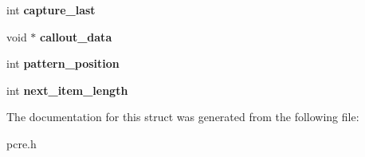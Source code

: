 \begin{DoxyCompactItemize}
\item 
\hypertarget{structpcre__callout__block_a989a280260effb9bf1521046a2507643}{
int {\bfseries capture\_\-last}}
\label{structpcre__callout__block_a989a280260effb9bf1521046a2507643}

\item 
\hypertarget{structpcre__callout__block_a45304eee0f48c835714a82fa762bab1c}{
void $\ast$ {\bfseries callout\_\-data}}
\label{structpcre__callout__block_a45304eee0f48c835714a82fa762bab1c}

\item 
\hypertarget{structpcre__callout__block_ac5caf602fa5ab812f8721451320b7adf}{
int {\bfseries pattern\_\-position}}
\label{structpcre__callout__block_ac5caf602fa5ab812f8721451320b7adf}

\item 
\hypertarget{structpcre__callout__block_a9360879d608b622daef0c7d1cf2606be}{
int {\bfseries next\_\-item\_\-length}}
\label{structpcre__callout__block_a9360879d608b622daef0c7d1cf2606be}

\end{DoxyCompactItemize}


The documentation for this struct was generated from the following file:\begin{DoxyCompactItemize}
\item 
pcre.h\end{DoxyCompactItemize}
